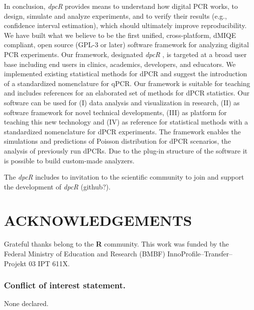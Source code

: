\documentclass[a4,center,fleqn]{NAR}
\begin{document}
In conclusion, \textit{dpcR} provides means to understand how digital PCR works, 
to design, simulate and analyze experiments, and to verify their results (e.g., 
confidence interval estimation), which should ultimately improve 
reproducibility. We have built what we believe to be the first unified, 
cross-platform, dMIQE compliant, open source (GPL-3 or later) software framework for 
analyzing digital PCR experiments. Our framework, designated \textit{dpcR} , is 
targeted at a broad user base including end users in clinics, academics, 
developers, and educators. We implemented existing statistical methods for dPCR 
and suggest the introduction of a standardized nomenclature for qPCR. Our 
framework is suitable for teaching and includes references for an elaborated 
set of methods for dPCR statistics. Our software can be used for (I) data 
analysis and visualization in research, (II) as software framework for novel 
technical developments, (III) as platform for teaching this new technology and 
(IV) as reference for statistical methods with a standardized nomenclature for 
dPCR experiments. The framework enables the simulations and predictions of Poisson 
distribution for dPCR scenarios, the analysis of previously run dPCRs. Due to 
the plug-in structure of the software it is possible to build custom-made 
analyzers.

The \textit{dpcR} includes 
to invitation to the scientific community to join and support the development of 
\textit{dpcR} (github?).


\section{ACKNOWLEDGEMENTS}

Grateful thanks belong to the \textbf{R} community. This work was funded by the Federal Ministry of Education and Research (BMBF)
 InnoProfile--Transfer--Projekt 03 IPT 611X.

\subsubsection{Conflict of interest statement.} None declared.
\newpage




\end{document}
